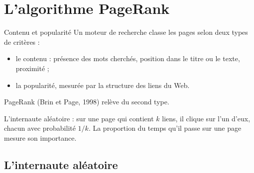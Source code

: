 \section{L'algorithme PageRank}

\begin{frame}{Contenu et popularité}
  \small Un moteur de recherche classe les pages selon deux types de
  critères :
  \begin{itemize}
    \item le contenu : présence des mots cherchés, position dans le titre
      ou le texte, proximité ;
    \item la popularité, mesurée par la structure des liens du Web.
  \end{itemize}
  PageRank (Brin et Page, 1998) relève du second type.
  \vspace{6pt}

  L'internaute aléatoire : sur une page qui contient $k$ liens, il clique
  sur l'un d'eux, chacun avec probabilité $1/k$. La proportion du temps
  qu'il passe sur une page mesure son importance.
\end{frame}

\subsection{L'internaute aléatoire}

